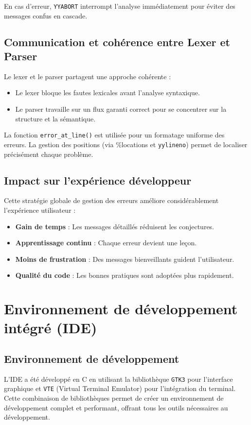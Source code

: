 \documentclass[12pt,a4paper]{article}
\begin{document}
En cas d’erreur, \texttt{YYABORT} interrompt l’analyse immédiatement pour éviter des messages confus en cascade.

\subsection{Communication et cohérence entre Lexer et Parser}
Le lexer et le parser partagent une approche cohérente :
\begin{itemize}
    \item Le lexer bloque les fautes lexicales avant l’analyse syntaxique.
    \item Le parser travaille sur un flux garanti correct pour se concentrer sur la structure et la sémantique.
\end{itemize}

La fonction \texttt{error\_at\_line()} est utilisée pour un formatage uniforme des erreurs. La gestion des positions (via \%locations et \texttt{yylineno}) permet de localiser précisément chaque problème.

\subsection{Impact sur l’expérience développeur}
Cette stratégie globale de gestion des erreurs améliore considérablement l’expérience utilisateur :
\begin{itemize}
    \item \textbf{Gain de temps} : Les messages détaillés réduisent les conjectures.
    \item \textbf{Apprentissage continu} : Chaque erreur devient une leçon.
    \item \textbf{Moins de frustration} : Des messages bienveillants guident l’utilisateur.
    \item \textbf{Qualité du code} : Les bonnes pratiques sont adoptées plus rapidement.
\end{itemize}


\newpage
\section{Environnement de développement intégré (IDE)}

\subsection{Environnement de développement}
L'IDE a été développé en C en utilisant la bibliothèque \texttt{GTK3} pour l'interface graphique et \texttt{VTE} (Virtual Terminal Emulator) pour l'intégration du terminal. Cette combinaison de bibliothèques permet de créer un environnement de développement complet et performant, offrant tous les outils nécessaires au développement.
\end{document}
